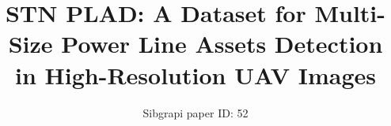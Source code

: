\documentclass[10pt,conference]{IEEEtran}
\newif\iffinal
\newcommand{\cmtid}{52}
\begin{document}
\title{STN PLAD: A Dataset for Multi-Size Power Line Assets Detection in High-Resolution UAV Images}




\iffinal









\author{\IEEEauthorblockN{André Luiz Buarque Vieira-e-Silva\IEEEauthorrefmark{1},
Heitor de Castro Felix\IEEEauthorrefmark{1},
Thiago de Menezes Chaves\IEEEauthorrefmark{1}, \\
Francisco Paulo Magalhães Simões\IEEEauthorrefmark{1}\IEEEauthorrefmark{2},
Veronica Teichrieb\IEEEauthorrefmark{1},
Michel Mozinho dos Santos\IEEEauthorrefmark{3}, \\
Hemir da Cunha Santiago\IEEEauthorrefmark{3},
Virginia Adélia Cordeiro Sgotti\IEEEauthorrefmark{3},
and
Henrique Baptista Duffles Teixeira Lott Neto\IEEEauthorrefmark{4}}
\IEEEauthorblockA{\IEEEauthorrefmark{1}Voxar Labs, Centro de Informática,
Universidade Federal de Pernambuco,
Recife, Brazil\\ \{albvs,hcf2,tmc2,vt\}@cin.ufpe.br}
\IEEEauthorblockA{\IEEEauthorrefmark{2}Departamento de Computação, Universidade Federal Rural de Pernambuco, Recife, Brazil\\
francisco.simoes@ufrpe.br}
\IEEEauthorblockA{\IEEEauthorrefmark{3}In Forma Software, Recife, Brazil\\
\{mmozinho,hsantiago\}@informasoftware.com.br, vsgotti@informa.com.br}
\IEEEauthorblockA{\IEEEauthorrefmark{4}Sistema de Transmissão Nordeste - STN, Recife, Brazil\\
hlott@stnordeste.com.br}}

\else
  \author{Sibgrapi paper ID: \cmtid \\ }
  \linenumbers
\fi


\maketitle
\end{document}
